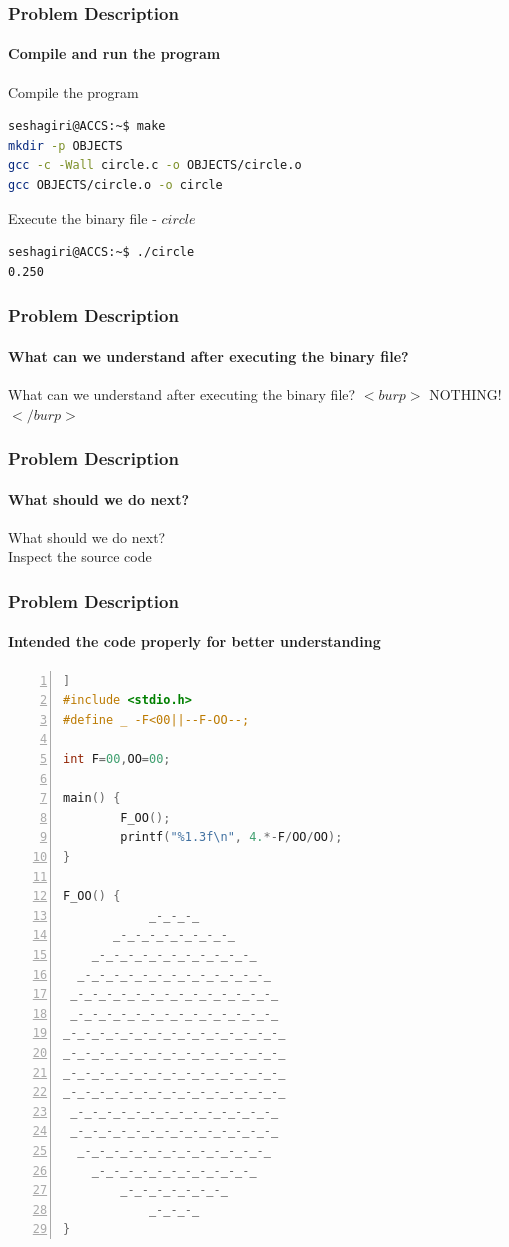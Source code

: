 \documentclass[12pt]{beamer}
\begin{document}
\begin{frame}[fragile]
	\frametitle{Problem Description}
	\framesubtitle{Compile and run the program}
	\tiny
	\begin{block}{Compile the program}
		\begin{lstlisting}[language=bash]
seshagiri@ACCS:~$ make
mkdir -p OBJECTS
gcc -c -Wall circle.c -o OBJECTS/circle.o
gcc OBJECTS/circle.o -o circle
    	\end{lstlisting}
    \end{block}
    
	\begin{block}{Execute the binary file - $circle$}
		\begin{lstlisting}[language=bash]
seshagiri@ACCS:~$ ./circle
0.250
		\end{lstlisting}
	\end{block}
\end{frame}

\begin{frame}
	\frametitle{Problem Description}
	\framesubtitle{What can we understand after executing the binary file?}
	\begin{center}
		\small What can we understand after executing the binary file?
		\small{$<burp>$} \huge {NOTHING!} \small {$</burp>$}
	\end{center}
\end{frame}

\begin{frame}
	\frametitle{Problem Description}
	\framesubtitle{What should we do next?}
	\begin{center}
		\small {What should we do next?} \\
		\large Inspect the source code
	\end{center}
\end{frame}

\begin{frame}[fragile]
	\frametitle{Problem Description}
	\framesubtitle{Intended the code properly for better understanding}
	\begin{lstlisting}[language=C, breaklines=true, commentstyle=\color{mygreen}, rulecolor=\color{black}, numbers=left,  numbersep=2pt, numberstyle=\tiny\color{mygray}] ]
#include <stdio.h>
#define _ -F<00||--F-OO--;

int F=00,OO=00;

main() {
        F_OO();
        printf("%1.3f\n", 4.*-F/OO/OO);
}

F_OO() {
            _-_-_-_
       _-_-_-_-_-_-_-_-_
    _-_-_-_-_-_-_-_-_-_-_-_
  _-_-_-_-_-_-_-_-_-_-_-_-_-_
 _-_-_-_-_-_-_-_-_-_-_-_-_-_-_
 _-_-_-_-_-_-_-_-_-_-_-_-_-_-_
_-_-_-_-_-_-_-_-_-_-_-_-_-_-_-_
_-_-_-_-_-_-_-_-_-_-_-_-_-_-_-_
_-_-_-_-_-_-_-_-_-_-_-_-_-_-_-_
_-_-_-_-_-_-_-_-_-_-_-_-_-_-_-_
 _-_-_-_-_-_-_-_-_-_-_-_-_-_-_
 _-_-_-_-_-_-_-_-_-_-_-_-_-_-_
  _-_-_-_-_-_-_-_-_-_-_-_-_-_
    _-_-_-_-_-_-_-_-_-_-_-_
        _-_-_-_-_-_-_-_
            _-_-_-_
}
	\end{lstlisting}

\end{frame}
\end{document}
